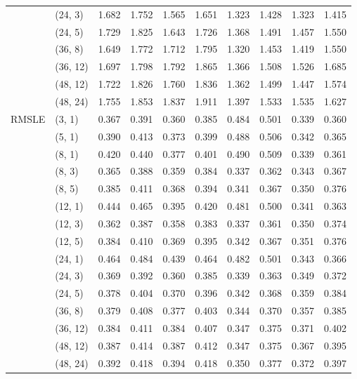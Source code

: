 \begin{longtable}{ll|rr|rr|rr|rr}
      & (24, 3) &     1.682 &      1.752 &   1.565 &    1.651 &    1.323 &     1.428 &  1.323 &   1.415 \\
      & (24, 5) &     1.729 &      1.825 &   1.643 &    1.726 &    1.368 &     1.491 &  1.457 &   1.550 \\
      & (36, 8) &     1.649 &      1.772 &   1.712 &    1.795 &    1.320 &     1.453 &  1.419 &   1.550 \\
      & (36, 12) &     1.697 &      1.798 &   1.792 &    1.865 &    1.366 &     1.508 &  1.526 &   1.685 \\
      & (48, 12) &     1.722 &      1.826 &   1.760 &    1.836 &    1.362 &     1.499 &  1.447 &   1.574 \\
      & (48, 24) &     1.755 &      1.853 &   1.837 &    1.911 &    1.397 &     1.533 &  1.535 &   1.627 \\
\hline \multirow{15}{*}{RMSLE} & (3, 1) &     0.367 &      0.391 &   0.360 &    0.385 &    0.484 &     0.501 &  0.339 &   0.360 \\
      & (5, 1) &     0.390 &      0.413 &   0.373 &    0.399 &    0.488 &     0.506 &  0.342 &   0.365 \\
      & (8, 1) &     0.420 &      0.440 &   0.377 &    0.401 &    0.490 &     0.509 &  0.339 &   0.361 \\
      & (8, 3) &     0.365 &      0.388 &   0.359 &    0.384 &    0.337 &     0.362 &  0.343 &   0.367 \\
      & (8, 5) &     0.385 &      0.411 &   0.368 &    0.394 &    0.341 &     0.367 &  0.350 &   0.376 \\
      & (12, 1) &     0.444 &      0.465 &   0.395 &    0.420 &    0.481 &     0.500 &  0.341 &   0.363 \\
      & (12, 3) &     0.362 &      0.387 &   0.358 &    0.383 &    0.337 &     0.361 &  0.350 &   0.374 \\
      & (12, 5) &     0.384 &      0.410 &   0.369 &    0.395 &    0.342 &     0.367 &  0.351 &   0.376 \\
      & (24, 1) &     0.464 &      0.484 &   0.439 &    0.464 &    0.482 &     0.501 &  0.343 &   0.366 \\
      & (24, 3) &     0.369 &      0.392 &   0.360 &    0.385 &    0.339 &     0.363 &  0.349 &   0.372 \\
      & (24, 5) &     0.378 &      0.404 &   0.370 &    0.396 &    0.342 &     0.368 &  0.359 &   0.384 \\
      & (36, 8) &     0.379 &      0.408 &   0.377 &    0.403 &    0.344 &     0.370 &  0.357 &   0.385 \\
      & (36, 12) &     0.384 &      0.411 &   0.384 &    0.407 &    0.347 &     0.375 &  0.371 &   0.402 \\
      & (48, 12) &     0.387 &      0.414 &   0.387 &    0.412 &    0.347 &     0.375 &  0.367 &   0.395 \\
      & (48, 24) &     0.392 &      0.418 &   0.394 &    0.418 &    0.350 &     0.377 &  0.372 &   0.397 \\
\bottomrule
\end{longtable}